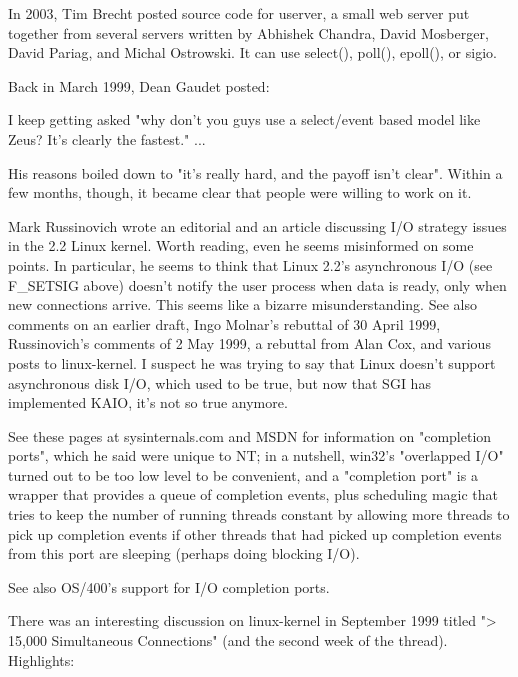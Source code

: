 \documentclass[twoside, xetex]{report}
\begin{document}
In 2003, Tim Brecht posted source code for userver, a small web server put together from several servers written by Abhishek Chandra, David Mosberger, David Pariag, and Michal Ostrowski. It can use select(), poll(), epoll(), or sigio.

Back in March 1999, Dean Gaudet posted:

I keep getting asked "why don't you guys use a select/event based model like Zeus? It's clearly the fastest." ...

His reasons boiled down to "it's really hard, and the payoff isn't clear". Within a few months, though, it became clear that people were willing to work on it.

Mark Russinovich wrote an editorial and an article discussing I/O strategy issues in the 2.2 Linux kernel. Worth reading, even he seems misinformed on some points. In particular, he seems to think that Linux 2.2's asynchronous I/O (see F\_SETSIG above) doesn't notify the user process when data is ready, only when new connections arrive. This seems like a bizarre misunderstanding. See also comments on an earlier draft, Ingo Molnar's rebuttal of 30 April 1999, Russinovich's comments of 2 May 1999, a rebuttal from Alan Cox, and various posts to linux-kernel. I suspect he was trying to say that Linux doesn't support asynchronous disk I/O, which used to be true, but now that SGI has implemented KAIO, it's not so true anymore.

See these pages at sysinternals.com and MSDN for information on "completion ports", which he said were unique to NT; in a nutshell, win32's "overlapped I/O" turned out to be too low level to be convenient, and a "completion port" is a wrapper that provides a queue of completion events, plus scheduling magic that tries to keep the number of running threads constant by allowing more threads to pick up completion events if other threads that had picked up completion events from this port are sleeping (perhaps doing blocking I/O).

See also OS/400's support for I/O completion ports.

There was an interesting discussion on linux-kernel in September 1999 titled "> 15,000 Simultaneous Connections" (and the second week of the thread). Highlights:
\end{document}
